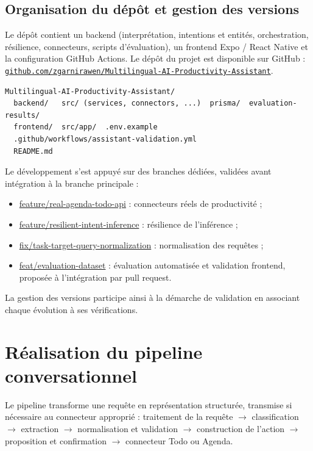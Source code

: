 \documentclass[11pt,a4paper,openany,oneside]{report}
\begin{document}
\subsection{Organisation du dépôt et gestion des versions}
Le dépôt contient un backend (interprétation, intentions et entités, orchestration, résilience, connecteurs, scripts d'évaluation), un frontend Expo / React Native et la configuration GitHub Actions.
Le dépôt du projet est disponible sur GitHub : \href{https://github.com/zgarnirawen/Multilingual-AI-Productivity-Assistant}{\texttt{github.com/zgarnirawen/Multilingual-AI-Productivity-Assistant}}.
\begin{lstlisting}
Multilingual-AI-Productivity-Assistant/
  backend/   src/ (services, connectors, ...)  prisma/  evaluation-results/
  frontend/  src/app/  .env.example
  .github/workflows/assistant-validation.yml
  README.md
\end{lstlisting}
Le développement s'est appuyé sur des branches dédiées, validées avant intégration à la branche principale :
\begin{itemize}
\item \url{feature/real-agenda-todo-api} : connecteurs réels de productivité ;
\item \url{feature/resilient-intent-inference} : résilience de l'inférence ;
\item \url{fix/task-target-query-normalization} : normalisation des requêtes ;
\item \url{feat/evaluation-dataset} : évaluation automatisée et validation frontend, proposée à l'intégration par pull request.
\end{itemize}
La gestion des versions participe ainsi à la démarche de validation en associant chaque évolution à ses vérifications.

\section{Réalisation du pipeline conversationnel}
Le pipeline transforme une requête en représentation structurée, transmise si nécessaire au connecteur approprié : traitement de la requête $\rightarrow$ classification $\rightarrow$ extraction $\rightarrow$ normalisation et validation $\rightarrow$ construction de l'action $\rightarrow$ proposition et confirmation $\rightarrow$ connecteur Todo ou Agenda.
\end{document}
